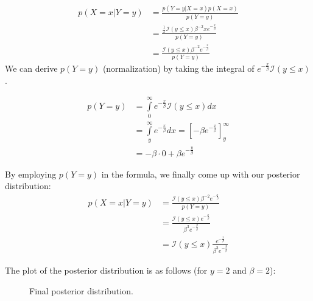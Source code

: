 \documentclass[../main/Notes.tex]{subfiles}
\begin{document}
\begin{align*}
p(X=x|Y=y) &= \frac{p(Y=y|X=x)p(X=x)}{p(Y=y)} \\
           &= \frac{\frac{1}{x} \mathcal{I}(y \leq x) \beta^{-2} x e^{-\frac{x}{\beta}}}{p(Y=y)} \\
           &= \frac{\mathcal{I}(y \leq x) \beta^{-2} e^{-\frac{x}{\beta}}}{p(Y=y)}
\end{align*}
We can derive $p(Y=y)$ (normalization) by taking the integral of $e^{-\frac{x}{\beta}}\mathcal{I}(y \leq x)$.

\begin{align*}
p(Y=y) &= \int\limits_0^\infty e^{-\frac{x}{\beta}} \mathcal{I}(y \leq x) dx \\
       &= \int\limits_y^\infty e^{-\frac{x}{\beta}} dx = \left[-\beta e^{-\frac{x}{\beta}} \right]_y^\infty \\
       &= -\beta \cdot 0 + \beta e^{-\frac{y}{\beta}}
\end{align*}

By employing $p(Y=y)$ in the formula, we finally come up with our posterior distribution:
\begin{align*}
p(X=x|Y=y) &= \frac{\mathcal{I}(y \leq x) \beta^{-2} e^{-\frac{x}{\beta}}}{p(Y=y)} \\
           &= \frac{\mathcal{I}(y \leq x) e^{-\frac{x}{\beta}}}{\beta^3 e^{-\frac{y}{\beta}}} \\
           &= \mathcal{I}(y \leq x) \frac{e^{-\frac{x}{\beta}}}{\beta^3 e^{-\frac{y}{\beta}}}
\end{align*}

The plot of the posterior distribution is as follows (for $y = 2$ and $\beta = 2$):
\begin{figure}[h]
  \centering
  \caption{Final posterior distribution.}
  \label{fig:2014-07-18-posterior}
\end{figure}
\end{document}
